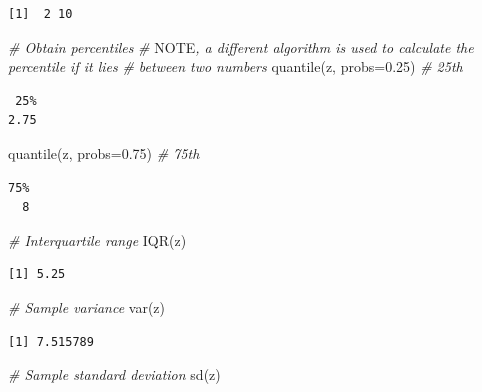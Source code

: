 \documentclass[
  oneside]{krantz}
\newenvironment{Shaded}{\begin{snugshade}}{\end{snugshade}}
\newcommand{\AlertTok}[1]{\textcolor[rgb]{0.94,0.16,0.16}{#1}}
\newcommand{\AttributeTok}[1]{\textcolor[rgb]{0.77,0.63,0.00}{#1}}
\newcommand{\CommentTok}[1]{\textcolor[rgb]{0.56,0.35,0.01}{\textit{#1}}}
\newcommand{\FloatTok}[1]{\textcolor[rgb]{0.00,0.00,0.81}{#1}}
\newcommand{\FunctionTok}[1]{\textcolor[rgb]{0.00,0.00,0.00}{#1}}
\newcommand{\NormalTok}[1]{#1}
\begin{document}
\begin{verbatim}
[1]  2 10
\end{verbatim}

\begin{Shaded}
\begin{Highlighting}[]
\CommentTok{\# Obtain percentiles}
\CommentTok{\# }\AlertTok{NOTE}\CommentTok{, a different algorithm is used to calculate the percentile if it lies}
\CommentTok{\#       between two numbers}
\FunctionTok{quantile}\NormalTok{(z, }\AttributeTok{probs=}\FloatTok{0.25}\NormalTok{) }\CommentTok{\# 25th }
\end{Highlighting}
\end{Shaded}

\begin{verbatim}
 25% 
2.75 
\end{verbatim}

\begin{Shaded}
\begin{Highlighting}[]
\FunctionTok{quantile}\NormalTok{(z, }\AttributeTok{probs=}\FloatTok{0.75}\NormalTok{) }\CommentTok{\# 75th}
\end{Highlighting}
\end{Shaded}

\begin{verbatim}
75% 
  8 
\end{verbatim}

\begin{Shaded}
\begin{Highlighting}[]
\CommentTok{\# Interquartile range}
\FunctionTok{IQR}\NormalTok{(z)}
\end{Highlighting}
\end{Shaded}

\begin{verbatim}
[1] 5.25
\end{verbatim}

\begin{Shaded}
\begin{Highlighting}[]
\CommentTok{\# Sample variance}
\FunctionTok{var}\NormalTok{(z)}
\end{Highlighting}
\end{Shaded}

\begin{verbatim}
[1] 7.515789
\end{verbatim}

\begin{Shaded}
\begin{Highlighting}[]
\CommentTok{\# Sample standard deviation}
\FunctionTok{sd}\NormalTok{(z)}
\end{Highlighting}
\end{Shaded}
\end{document}
